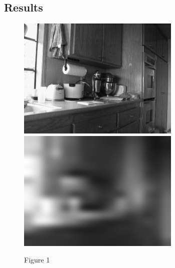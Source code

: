 \documentclass[letter, 11pt]{article}
\begin{document}
\subsection*{Results}
\begin{figure}[H]
        \centering
        \includegraphics[width=\textwidth]{HW3/RESULT/original.png}
    \endminipage\hfill
        \centering
        \includegraphics[width=\textwidth]{HW3/RESULT/tiny.png}
    \endminipage\hfill
    \caption*{Figure 1}
\end{figure}
\end{document}
